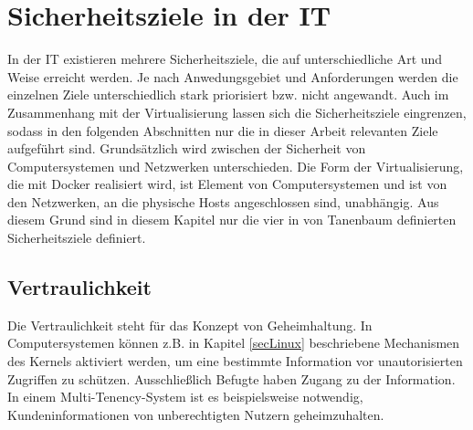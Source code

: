 \documentclass[../main.tex]{subfiles}
\begin{document}

  \section{Sicherheitsziele in der IT}
  \label{introSecGoals}
		In der IT existieren mehrere Sicherheitsziele, die auf unterschiedliche Art und Weise erreicht werden. Je nach Anwedungsgebiet und Anforderungen werden die einzelnen Ziele unterschiedlich stark priorisiert bzw. nicht angewandt. Auch im Zusammenhang mit der Virtualisierung lassen sich die Sicherheitsziele eingrenzen, sodass in den folgenden Abschnitten nur die in dieser Arbeit relevanten Ziele aufgeführt sind.
		Grundsätzlich wird zwischen der Sicherheit von Computersystemen und Netzwerken unterschieden. Die Form der Virtualisierung, die mit Docker realisiert wird, ist Element von Computersystemen und ist von den Netzwerken, an die physische Hosts angeschlossen sind, unabhängig. Aus diesem Grund sind in diesem Kapitel nur die vier in \cite[S.712f.]{tanenbaumOS} von Tanenbaum definierten Sicherheitsziele definiert.





    \subsection{Vertraulichkeit}
			Die Vertraulichkeit steht für das Konzept von Geheimhaltung. In Computersystemen können z.B. in Kapitel \ref{secLinux} beschriebene Mechanismen des Kernels aktiviert werden, um eine bestimmte Information vor unautorisierten Zugriffen zu schützen. Ausschließlich Befugte haben Zugang zu der Information. In einem Multi-Tenency-System ist es beispielsweise notwendig, Kundeninformationen von unberechtigten Nutzern geheimzuhalten.
\end{document}
